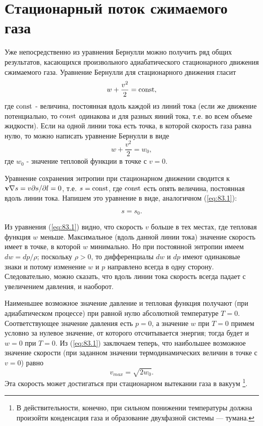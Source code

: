 
\section{Стационарный поток сжимаемого газа}\label{sec:p83}

Уже непосредственно из уравнения Бернулли можно получить ряд общих результатов, касающихся произвольного адиабатического стационарного движения сжимаемого газа.
Уравнение Бернулли для стационарного движения гласит
\[
    w + \frac{v^2}{2} = \mathop{\mathrm{const}}\nolimits,
\]
где $\mathop{\mathrm{const}}\nolimits$ - величина, постоянная вдоль каждой из линий тока (если же движение потенциально, то $\mathop{\mathrm{const}}\nolimits$ одинакова и для разных яиний тока, т.е. во всем объеме жидкости).
Если на одной линии тока есть точка, в которой скорость газа равна нулю, то можно написать уравнение Бернулли в виде
\begin{equation}
    \label{eq:83.1}
    w + \frac{v^2}{2} = w_0,
\end{equation}
где $w_0$ - значение тепловой функции в точке с $v = 0$.

Уравнение сохранения энтропии при стационарном движении сводится к 
$\mathbf{v} \nabla s = v \partial s/ \partial l = 0$, т.е. $s = \mathop{\mathrm{const}}\nolimits$, где $\mathop{\mathrm{const}}\nolimits$ есть опять величина, постоянная вдоль линии тока. Напишем это уравнение в виде, аналогичном (\ref{eq:83.1}):

\begin{equation}
    \label{eq:83.2}
    s = s_0.
\end{equation}


Из уравнения (\ref{eq:83.1}) видно, что скорость $v$ больше в тех местах, где тепловая функция $w$ меньше.
Максимальное (вдоль данной линии тока) значение скорость имеет в точке, в которой $w$ минимально.
Но при постоянной энтропии имеем $dw = dp/\rho$; поскольку $\rho>0$, то дифференциалы $dw$ и $dp$ имеют одинаковые знаки и потому изменение $w$ и $p$ направлено всегда в одну сторону. 
Следовательно, можно сказать, что вдоль линии тока скорость всегда падает с увеличением давления, и наоборот.

Наименьшее возможное значение давление и тепловая функция получают (при адиабатическом процессе) при равной нулю абсолютной температуре $T = 0$.
Соответствующее значение давления есть $p = 0$, а значение $w$ при $T = 0$ примем условно за нулевое значение, от которого отсчитывается энергия;
тогда будет и $w = 0$ при $T = 0$. Из (\ref{eq:83.1}) заключаем теперь, что наибольшее возможное значение скорости (при заданном значении термодинамических величин в точке с $v = 0$) равно
\begin{equation}
    \label{eq:83.3}
    v_{max} = \sqrt{2w_0}.
\end{equation}
Эта скорость может достигаться при стационарном вытекании газа в вакуум 
\footnote{В действительности, конечно, при сильном понижении температуры должна произойти конденсация газа и образование двухфазной системы — тумана.}.

